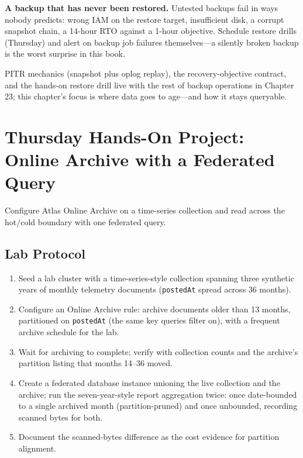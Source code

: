 \begin{pitfall}
\textbf{A backup that has never been restored.} Untested backups fail in ways nobody predicts: wrong IAM on the restore target, insufficient disk, a corrupt snapshot chain, a 14-hour RTO against a 1-hour objective. Schedule restore drills (Thursday) and alert on backup job failures themselves---a silently broken backup is the worst surprise in this book.
\end{pitfall}


\begin{notebox}
PITR mechanics (snapshot plus oplog replay), the recovery-objective contract, and the hands-on restore drill live with the rest of backup operations in Chapter 23; this chapter's focus is where data goes to age---and how it stays queryable.
\end{notebox}

\section{Thursday Hands-On Project: Online Archive with a Federated Query}
Configure Atlas Online Archive on a time-series collection and read across the hot/cold boundary with one federated query.

\subsection{Lab Protocol}
\begin{enumerate}
    \item Seed a lab cluster with a time-series-style collection spanning three synthetic years of monthly telemetry documents (\texttt{postedAt} spread across 36 months).
    \item Configure an Online Archive rule: archive documents older than 13 months, partitioned on \texttt{postedAt} (the same key queries filter on), with a frequent archive schedule for the lab.
    \item Wait for archiving to complete; verify with collection counts and the archive's partition listing that months 14--36 moved.
    \item Create a federated database instance unioning the live collection and the archive; run the seven-year-style report aggregation twice: once date-bounded to a single archived month (partition-pruned) and once unbounded, recording scanned bytes for both.
    \item Document the scanned-bytes difference as the cost evidence for partition alignment.
\end{enumerate}

